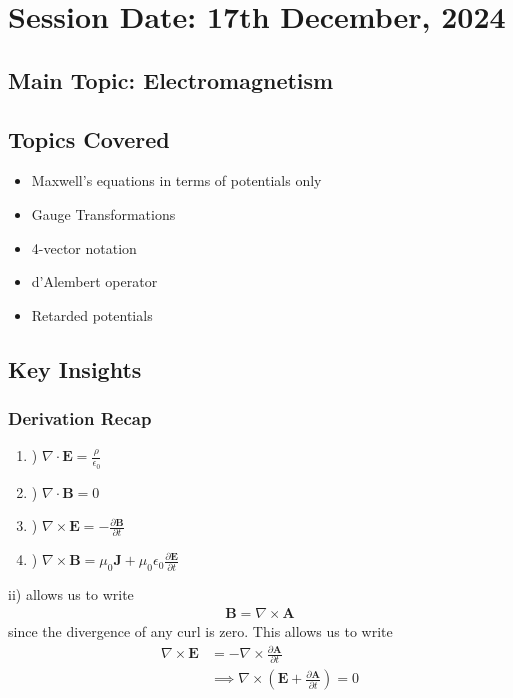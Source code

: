 \section{Session Date: 17th December, 2024}
\subsection*{Main Topic: Electromagnetism}
\subsection*{Topics Covered}
\begin{itemize}
    \item Maxwell's equations in terms of potentials only
    \item Gauge Transformations
    \item 4-vector notation
    \item d'Alembert operator
    \item Retarded potentials
\end{itemize}

\subsection*{Key Insights}
\subsubsection*{Derivation Recap}
\begin{enumerate}[label=\roman*]
    \item) $\nabla \cdot \mathbf{E} = \frac{\rho}{\epsilon_0}$
    \item) $\nabla \cdot \mathbf{B} = 0$
    \item) $\nabla \times \mathbf{E} = - \frac{\partial \mathbf{B}}{\partial t}$
    \item) $\nabla \times \mathbf{B} = \mu_0 \mathbf{J} + \mu_0 \epsilon _0 \frac{\partial \mathbf{E}}{\partial t}$
\end{enumerate}

ii) allows us to write \begin{align*}
    \boxed{\mathbf{B} = \nabla \times \mathbf{A}}
\end{align*}since the divergence of any curl is zero. This allows us to write \begin{align*}
    \nabla \times \mathbf{E} &= - \nabla \times \frac{\partial \mathbf{A}}{\partial t} \\
    &\implies \nabla \times \left( \mathbf{E} + \frac{\partial \mathbf{A}}{\partial t}  \right) = 0
\end{align*}

